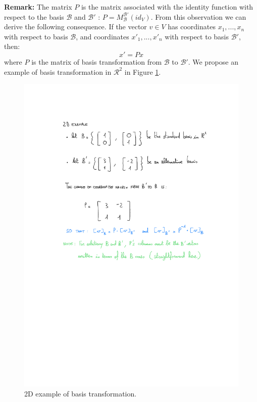 \textbf{Remark:} The matrix $P$ is the matrix associated with the identity function with respect to the basis $\mathcal{B}$ and $\mathcal{B}'$ : $P = M^{\mathcal{B}'}_{\mathcal{B}}(id_V)$. From this observation we can derive the following consequence. If the vector $v \in V$ has coordinates $x_1,...,x_n$ with respect to basis $\mathcal{B}$, and coordinates $x'_1,...,x'_n$ with respect to basis $\mathcal{B}'$, then:
\begin{equation}
    x' = Px
\end{equation}
where $P$ is the matrix of basis transformation from $\mathcal{B}$ to $\mathcal{B}'$. We propose an example of basis transformation in $\mathcal{R}^2$ in Figure \ref{fig:basis_transformation}.

\begin{figure}
    \centering
    \includegraphics[scale=0.5]{images/Esempio matrice cambiamento di base.pdf}
    \caption{2D example of basis transformation.}
    \label{fig:basis_transformation}
\end{figure}

